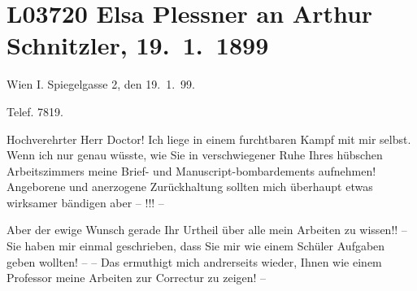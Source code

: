 

\section[Elsa Plessner an Arthur Schnitzler, 19. 1. 1899]{L03720 Elsa Plessner an Arthur Schnitzler, 19. 1. 1899}
\nopagebreak{}
\rehead{ }\normalsize\beginnumbering{}
\toendnotes[C]{\smallbreak\pagebreak[2]}
\toendnotes[C]{\smallbreak}
\toendnotes[C]{\smallbreak}
\pstart
           \raggedleft{}{\pb}Wien I. Spiegelgasse 2, den
                     19. 1. 99.\pend
           
\pstart
           \raggedleft{}Telef. 7819.\pend
           
\pstart{}Hochverehrter Herr Doctor!\pend\vspace{0.5em}
\pstart
           Ich liege in einem furchtbaren Kampf mit mir selbst. Wenn ich nur genau wüsste, wie
               Sie in verschwiegener Ruhe Ihres hübschen Arbeitszimmers meine Brief- und
               Manuscript-bombardements aufnehmen! Angeborene und anerzogene Zurückhaltung sollten
               mich überhaupt etwas wirksamer bändigen aber – !!! –\pend
           
\pstart
           Aber der ewige Wunsch gerade Ihr Urtheil über alle mein Arbeiten zu wissen!! – Sie
                  {\pb}haben mir einmal geschrieben, dass Sie mir wie
               einem Schüler Aufgaben geben wollten! – – Das ermuthigt mich andrerseits wieder,
               Ihnen wie einem Professor meine Arbeiten zur Correctur zu zeigen! –\pend
           

